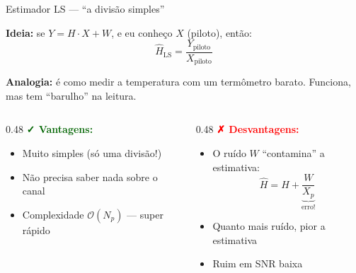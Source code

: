 \documentclass[aspectratio=169, 11pt]{beamer}
\begin{document}
\begin{frame}{Estimador LS --- ``a divisão simples''}

    \textbf{Ideia:} se $Y = H \cdot X + W$, e eu conheço $X$ (piloto), então:
    \begin{equation*}
        \boxed{\hat{H}_{\text{LS}} = \frac{Y_{\text{piloto}}}{X_{\text{piloto}}}}
    \end{equation*}

    \pause
    \vspace{0.2cm}
    \textbf{Analogia:} é como medir a temperatura com um termômetro barato. Funciona, mas tem ``barulho'' na leitura.

    \pause
    \vspace{0.3cm}
    \begin{columns}[T]
        \begin{column}{0.48\textwidth}
            \textcolor{darkgreen}{\textbf{✓ Vantagens:}}
            \begin{itemize}
                \item Muito simples (só uma divisão!)
                \item Não precisa saber nada sobre o canal
                \item Complexidade $\mathcal{O}(N_p)$ — super rápido
            \end{itemize}
        \end{column}
        \begin{column}{0.48\textwidth}
            \textcolor{red}{\textbf{✗ Desvantagens:}}
            \begin{itemize}
                \item O ruído $W$ ``contamina'' a estimativa:
                    $$\hat{H} = H + \underbrace{\frac{W}{X_p}}_{\text{erro!}}$$
                \item Quanto mais ruído, pior a estimativa
                \item Ruim em SNR baixa
            \end{itemize}
        \end{column}
    \end{columns}
\end{frame}
\end{document}
